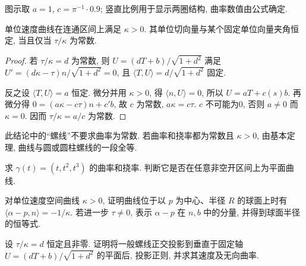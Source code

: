 图示取 $a=1$, $c=\pi^{-1}\cdot0.9$; 竖直比例用于显示两圈结构, 曲率数值由公式确定.
\begin{theorem}[一般螺线判据]\label{thm:lancret}
单位速度曲线在连通区间上满足 $\kappa>0$. 其单位切向量与某个固定单位向量夹角恒定, 当且仅当 $\tau/\kappa$ 为常数.
\end{theorem}
\begin{proof}
若 $\tau/\kappa=d$ 为常数, 则 $U=(dT+b)/\sqrt{1+d^2}$ 满足 $U'=(d\kappa-\tau)n/\sqrt{1+d^2}=0$, 且 $\langle T,U\rangle=d/\sqrt{1+d^2}$ 固定.

反之设 $\langle T,U\rangle=a$ 恒定. 微分并用 $\kappa>0$, 得 $\langle n,U\rangle=0$, 所以 $U=aT+c(s)b$. 再微分得 $0=(a\kappa-c\tau)n+c'b$, 故 $c$ 为常数, $a\kappa=c\tau$. $c$ 不可能为0, 否则 $a\ne0$ 而 $\kappa=0$. 因而 $\tau/\kappa=a/c$ 为常数.
\end{proof}
此结论中的“螺线”不要求曲率为常数. 若曲率和挠率都为常数且 $\kappa>0$, 由基本定理, 曲线与圆或圆柱螺线的一段全等.
\begin{exercise}\label{ex:3a}
求 $\gamma(t)=(t,t^2,t^3)$ 的曲率和挠率. 判断它是否在任意非空开区间上为平面曲线.
\end{exercise}
\begin{exercise}\label{ex:3b}
对单位速度空间曲线 $\kappa>0$, 证明曲线位于以 $p$ 为中心、半径 $R$ 的球面上时有 $\langle\alpha-p,n\rangle=-1/\kappa$. 若进一步 $\tau\ne0$, 表示 $\alpha-p$ 在 $n,b$ 中的分量, 并得到球面半径的恒等式.
\end{exercise}
\begin{exercise}\label{ex:3c}
设 $\tau/\kappa=d$ 恒定且非零. 证明将一般螺线正交投影到垂直于固定轴 $U=(dT+b)/\sqrt{1+d^2}$ 的平面后, 投影正则, 并求其速度及无向曲率.
\end{exercise}
